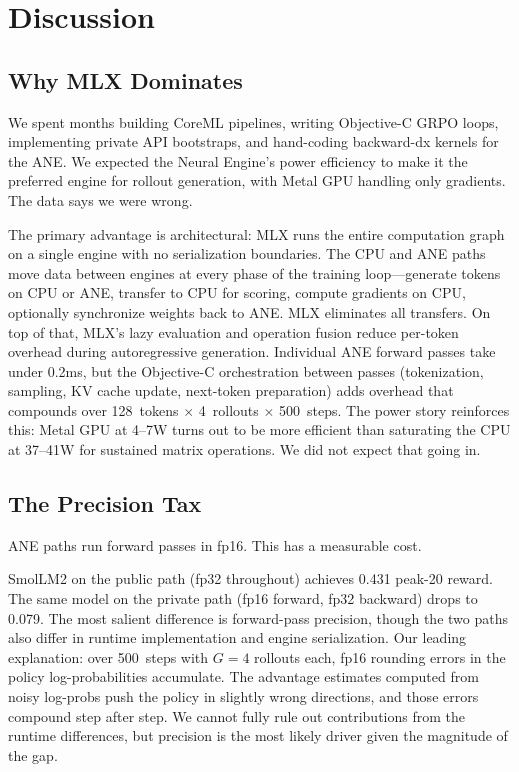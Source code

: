\documentclass[11pt]{article}
\begin{document}
\section{Discussion}
\label{sec:discussion}

\subsection{Why MLX Dominates}

We spent months building CoreML pipelines, writing Objective-C GRPO loops, implementing private API bootstraps, and hand-coding backward-dx kernels for the ANE.  We expected the Neural Engine's power efficiency to make it the preferred engine for rollout generation, with Metal GPU handling only gradients.  The data says we were wrong.

The primary advantage is architectural: MLX runs the entire computation graph on a single engine with no serialization boundaries.  The CPU and ANE paths move data between engines at every phase of the training loop---generate tokens on CPU or ANE, transfer to CPU for scoring, compute gradients on CPU, optionally synchronize weights back to ANE.  MLX eliminates all transfers.  On top of that, MLX's lazy evaluation and operation fusion reduce per-token overhead during autoregressive generation.  Individual ANE forward passes take under 0.2ms, but the Objective-C orchestration between passes (tokenization, sampling, KV cache update, next-token preparation) adds overhead that compounds over 128~tokens $\times$ 4~rollouts $\times$ 500~steps.  The power story reinforces this: Metal GPU at 4--7W turns out to be more efficient than saturating the CPU at 37--41W for sustained matrix operations.  We did not expect that going in.

\subsection{The Precision Tax}

ANE paths run forward passes in fp16.  This has a measurable cost.

SmolLM2 on the public path (fp32 throughout) achieves 0.431 peak-20 reward.  The same model on the private path (fp16 forward, fp32 backward) drops to 0.079.  The most salient difference is forward-pass precision, though the two paths also differ in runtime implementation and engine serialization.  Our leading explanation: over 500~steps with $G=4$ rollouts each, fp16 rounding errors in the policy log-probabilities accumulate.  The advantage estimates computed from noisy log-probs push the policy in slightly wrong directions, and those errors compound step after step.  We cannot fully rule out contributions from the runtime differences, but precision is the most likely driver given the magnitude of the gap.
\end{document}
